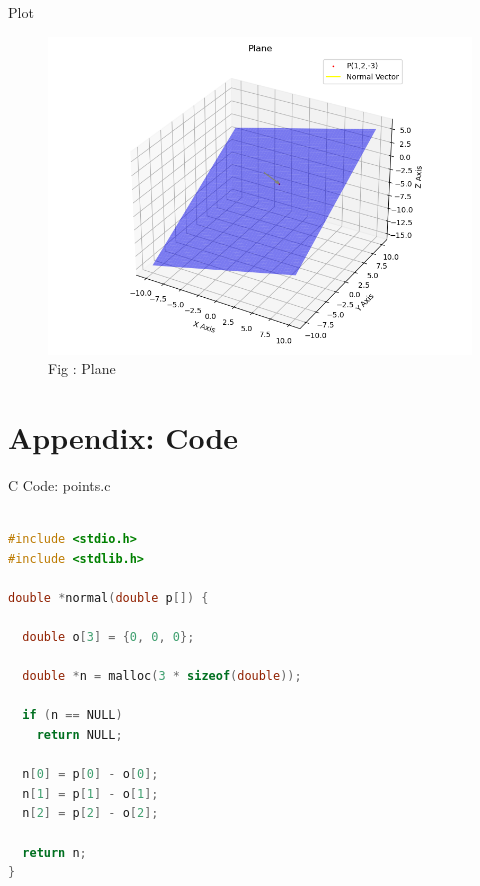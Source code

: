 \documentclass{beamer}
\numberwithin{equation}{section}
\theoremstyle{remark}
\begin{document}
\begin{frame}{Plot}

\begin{figure}[h!]
  \centering
  \includegraphics[width=0.8\columnwidth]{figs/plane.png} 
   \caption*{Fig : Plane}
  \label{Fig1}
\end{figure}

\end{frame}

\section*{Appendix: Code}

\begin{frame}[fragile]{C Code: points.c}
\begin{lstlisting}[language=C]

#include <stdio.h>
#include <stdlib.h>

double *normal(double p[]) {

  double o[3] = {0, 0, 0};

  double *n = malloc(3 * sizeof(double));

  if (n == NULL)
    return NULL;

  n[0] = p[0] - o[0];
  n[1] = p[1] - o[1];
  n[2] = p[2] - o[2];

  return n;
}

\end{lstlisting}
\end{frame}
\end{document}
